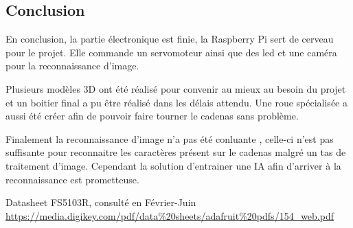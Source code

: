 \documentclass[twoside]{article}
\begin{document}
\begin{multicols}{2}
\section{Conclusion}

En conclusion, la partie électronique est finie, la Raspberry Pi sert de cerveau pour le projet. Elle commande un servomoteur ainsi que des led et une caméra pour la reconnaissance d'image.

Plusieurs modèles 3D ont été réalisé pour convenir au mieux au besoin du projet et un boitier final a pu être réalisé dans les délais attendu. Une roue spécialisée a aussi été créer afin de pouvoir faire tourner le cadenas sans problème.

Finalement la reconnaissance d'image n'a pas été conluante , celle-ci n'est pas suffisante pour reconnaitre les caractères présent sur le cadenas malgré un tas de traitement d'image. Cependant la solution d'entrainer une IA afin d'arriver à la reconnaissance est prometteuse.

\begin{thebibliography}{99} %

Datasheet FS5103R, consulté en Février-Juin
\\{ \url{https://media.digikey.com/pdf/data\%20sheets/adafruit\%20pdfs/154_web.pdf}}
 
\end{thebibliography}


\end{multicols}
\end{document}
